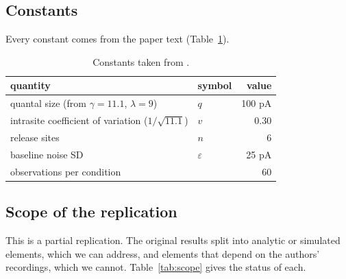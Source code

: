 \documentclass[a4paper, oneside, 10pt]{article}
\renewcommand{\citet}[1]{\citeauthor{#1}\supercite{#1}}
\begin{document}
\subsection{Constants}

Every constant comes from the paper text (Table~\ref{tab:constants}).

\begin{table}[!htb]
\centering
\caption{Constants taken from \citet{bhumbra2013}.}
\label{tab:constants}
\begin{tabular}{@{}llr@{}}
\toprule
quantity & symbol & value \\
\midrule
quantal size (from \(\gamma = 11.1\), \(\lambda = 9\)) & \(q\) & 100 pA \\
intrasite coefficient of variation (\(1/\sqrt{11.1}\)) & \(v\) & 0.30 \\
release sites & \(n\) & 6 \\
baseline noise SD & \(\varepsilon\) & 25 pA \\
observations per condition & & 60 \\
\bottomrule
\end{tabular}
\end{table}

\subsection{Scope of the replication}

This is a partial replication. The original results split into analytic or simulated elements, which we can address, and elements that depend on the authors' recordings, which we cannot. Table~\ref{tab:scope} gives the status of each.
\end{document}
